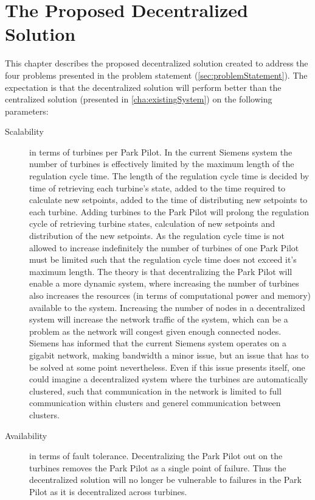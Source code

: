 \chapter{The Proposed Decentralized Solution}\label{cha:decentralizedSystem}

This chapter describes the proposed decentralized solution created to address the four problems presented in the problem statement (\cref{sec:problemStatement}). The expectation is that the decentralized solution will perform better than the centralized solution (presented in \cref{cha:existingSystem}) on the following parameters:

\begin{description}
	\item[Scalability] in terms of turbines per Park Pilot.
	In the current Siemens system the number of turbines is effectively limited by the maximum length of the regulation cycle time.
	The length of the regulation cycle time is decided by time of retrieving each turbine's state, added to the time required to calculate new setpoints, added to the time of distributing new setpoints to each turbine. Adding turbines to the Park Pilot will prolong the regulation cycle of retrieving turbine states, calculation of new setpoints and distribution of the new setpoints. As the regulation cycle time is not allowed to increase indefinitely the number of turbines of one Park Pilot must be limited such that the regulation cycle time does not exceed it's maximum length.
	The theory is that decentralizing the Park Pilot will enable a more dynamic system, where increasing the number of turbines also increases the resources (in terms of computational power and memory) available to the system. Increasing the number of nodes in a decentralized system will increase the network traffic of the system, which can be a problem as the network will congest given enough connected nodes. Siemens has informed that the current Siemens system operates on a gigabit network, making bandwidth a minor issue, but an issue that has to be solved at some point nevertheless. Even if this issue presents itself, one could imagine a decentralized system where the turbines are automatically clustered, such that communication in the network is limited to full communication within clusters and generel communication between clusters.
	\item[Availability] in terms of fault tolerance. Decentralizing the Park Pilot out on the turbines removes the Park Pilot as a single point of failure. Thus the decentralized solution will no longer be vulnerable to failures in the Park Pilot as it is decentralized across turbines.

\end{description}
